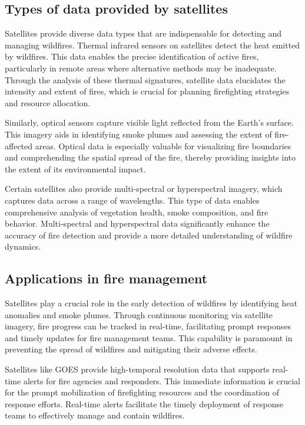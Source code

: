 \documentclass[
  12 pt,
]{Nemilov}
\begin{document}
\subsection{Types of data provided by satellites}\label{types-of-data-provided-by-satellites}

Satellites provide diverse data types that are indispensable for detecting and managing wildfires. Thermal infrared sensors on satellites detect the heat emitted by wildfires. This data enables the precise identification of active fires, particularly in remote areas where alternative methods may be inadequate. Through the analysis of these thermal signatures, satellite data elucidates the intensity and extent of fires, which is crucial for planning firefighting strategies and resource allocation.

Similarly, optical sensors capture visible light reflected from the Earth's surface. This imagery aids in identifying smoke plumes and assessing the extent of fire-affected areas. Optical data is especially valuable for visualizing fire boundaries and comprehending the spatial spread of the fire, thereby providing insights into the extent of its environmental impact.

Certain satellites also provide multi-spectral or hyperspectral imagery, which captures data across a range of wavelengths. This type of data enables comprehensive analysis of vegetation health, smoke composition, and fire behavior. Multi-spectral and hyperspectral data significantly enhance the accuracy of fire detection and provide a more detailed understanding of wildfire dynamics.

\subsection{Applications in fire management}\label{applications-in-fire-management}

Satellites play a crucial role in the early detection of wildfires by identifying heat anomalies and smoke plumes. Through continuous monitoring via satellite imagery, fire progress can be tracked in real-time, facilitating prompt responses and timely updates for fire management teams. This capability is paramount in preventing the spread of wildfires and mitigating their adverse effects.

Satellites like GOES provide high-temporal resolution data that supports real-time alerts for fire agencies and responders. This immediate information is crucial for the prompt mobilization of firefighting resources and the coordination of response efforts. Real-time alerts facilitate the timely deployment of response teams to effectively manage and contain wildfires.
\end{document}
